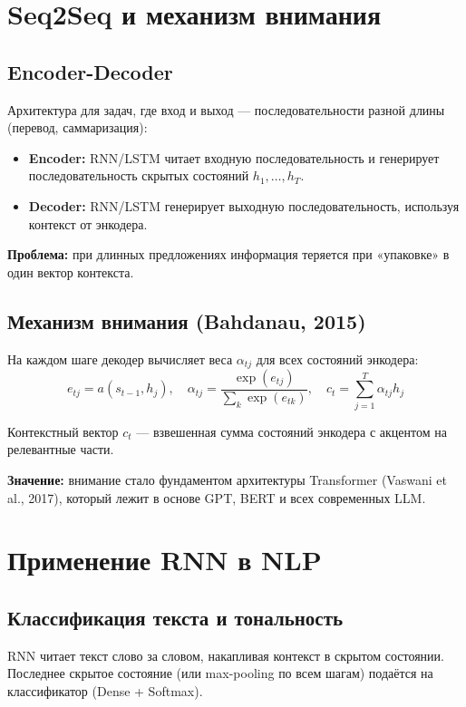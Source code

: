 \documentclass[a4paper,12pt]{article}
\begin{document}
\section{Seq2Seq и механизм внимания}

\subsection{Encoder-Decoder}

Архитектура для задач, где вход и выход — последовательности разной длины (перевод, саммаризация):
\begin{itemize}
    \item \textbf{Encoder:} RNN/LSTM читает входную последовательность и генерирует последовательность скрытых состояний $h_1, \dots, h_T$.
    \item \textbf{Decoder:} RNN/LSTM генерирует выходную последовательность, используя контекст от энкодера.
\end{itemize}

\textbf{Проблема:} при длинных предложениях информация теряется при «упаковке» в один вектор контекста.

\subsection{Механизм внимания (Bahdanau, 2015)}

На каждом шаге декодер вычисляет веса $\alpha_{tj}$ для всех состояний энкодера:
\[
e_{tj} = a(s_{t-1}, h_j), \quad
\alpha_{tj} = \frac{\exp(e_{tj})}{\sum_{k} \exp(e_{tk})}, \quad
c_t = \sum_{j=1}^{T} \alpha_{tj} h_j
\]

Контекстный вектор $c_t$ — взвешенная сумма состояний энкодера с акцентом на релевантные части.

\textbf{Значение:} внимание стало фундаментом архитектуры Transformer (Vaswani et al., 2017), который лежит в основе GPT, BERT и всех современных LLM.

\section{Применение RNN в NLP}

\subsection{Классификация текста и тональность}

RNN читает текст слово за словом, накапливая контекст в скрытом состоянии. Последнее скрытое состояние (или max-pooling по всем шагам) подаётся на классификатор (Dense + Softmax).
\end{document}
